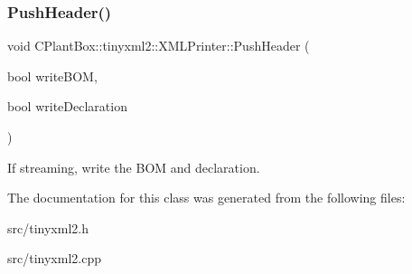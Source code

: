 \subsubsection{\texorpdfstring{Push\+Header()}{PushHeader()}}
{\footnotesize\ttfamily void C\+Plant\+Box\+::tinyxml2\+::\+X\+M\+L\+Printer\+::\+Push\+Header (\begin{DoxyParamCaption}\item[{bool}]{write\+B\+OM,  }\item[{bool}]{write\+Declaration }\end{DoxyParamCaption})}

If streaming, write the B\+OM and declaration. 

The documentation for this class was generated from the following files\+:\begin{DoxyCompactItemize}
\item 
src/tinyxml2.\+h\item 
src/tinyxml2.\+cpp\end{DoxyCompactItemize}
